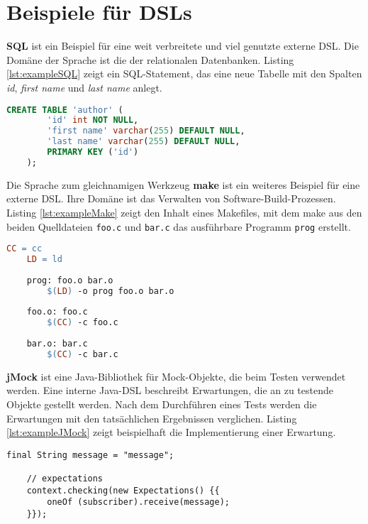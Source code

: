 \section{Beispiele für DSLs}\label{sct:2.3:beispiele}
\textbf{SQL} ist ein Beispiel für eine weit verbreitete und viel genutzte externe DSL. Die Domäne der Sprache ist die der relationalen Datenbanken. Listing \ref{lst:exampleSQL} zeigt ein SQL-Statement, das eine neue Tabelle mit den Spalten \emph{id}, \emph{first name} und \emph{last name} anlegt.\\

\begin{lstlisting}[caption={beispielhafter SQL-Code}, language=SQL, label=lst:exampleSQL]
	CREATE TABLE 'author' (
		'id' int NOT NULL,
		'first name' varchar(255) DEFAULT NULL,
		'last name' varchar(255) DEFAULT NULL,
		PRIMARY KEY ('id')
	);
\end{lstlisting}

Die Sprache zum gleichnamigen Werkzeug \textbf{make} ist ein weiteres Beispiel für eine externe DSL. Ihre Domäne ist das Verwalten von Software-Build-Prozessen. Listing \ref{lst:exampleMake} zeigt den Inhalt eines Makefiles, mit dem make aus den beiden Quelldateien \texttt{foo.c} und \texttt{bar.c} das ausführbare Programm \texttt{prog} erstellt.\\

\begin{lstlisting}[caption={beispielhaftes Makefile}, language=make, label=lst:exampleMake]
	CC = cc
	LD = ld
	
	prog: foo.o bar.o
		$(LD) -o prog foo.o bar.o
	
	foo.o: foo.c
		$(CC) -c foo.c
	
	bar.o: bar.c
		$(CC) -c bar.c
\end{lstlisting}

\textbf{jMock} \cite{www:jmock} ist eine Java-Bibliothek für Mock-Objekte, die beim Testen verwendet werden. Eine interne Java-DSL beschreibt Erwartungen, die an zu testende Objekte gestellt werden. Nach dem Durchführen eines Tests werden die Erwartungen mit den tatsächlichen Ergebnissen verglichen. Listing \ref{lst:exampleJMock} zeigt beispielhaft die Implementierung einer Erwartung.

\begin{lstlisting}[caption={Beispiel für eine Erwartung in jMock},label=lst:exampleJMock]
	final String message = "message";
	        
	// expectations
	context.checking(new Expectations() {{
		oneOf (subscriber).receive(message);
	}});
\end{lstlisting}


